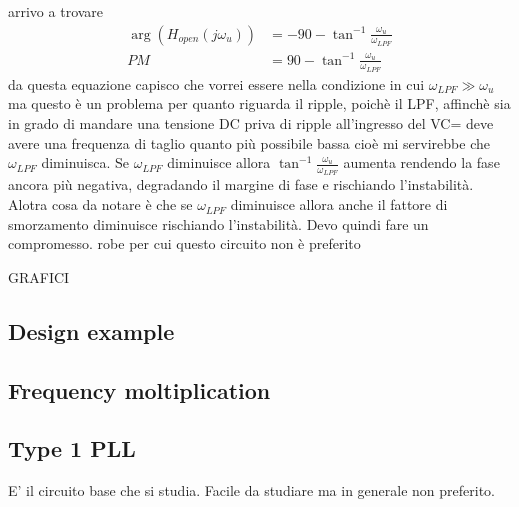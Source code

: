 arrivo a trovare
\begin{align}
    \arg(H_{open}(j\omega_u))&=-90-\tan^{-1}\frac{\omega_u}{\omega_{LPF}} \\
    PM&=90-\tan^{-1}\frac{\omega_u}{\omega_{LPF}} 
\end{align}
da questa equazione capisco che vorrei essere nella condizione in cui $\omega_{LPF} \gg \omega_u$ ma questo è un problema per quanto riguarda il ripple, poichè il LPF, affinchè sia in grado di mandare una tensione DC priva di ripple all'ingresso del VC= deve avere una frequenza di taglio quanto più possibile bassa cioè mi servirebbe che $\omega_{LPF}$ diminuisca.
Se $\omega_{LPF}$ diminuisce allora $\tan^{-1}\frac{\omega_u}{\omega_{LPF}}$ aumenta rendendo la fase ancora più negativa, degradando il margine di fase e rischiando l'instabilità.
Alotra cosa da notare è che se $\omega_{LPF}$ diminuisce allora anche il fattore di smorzamento diminuisce rischiando l'instabilità.
Devo quindi fare un compromesso. robe per cui questo circuito non è preferito

GRAFICI
\subsection{Design example}
\subsection{Frequency moltiplication}
\subsection{Type 1 PLL}


{}%
{}%
%
E' il circuito base che si studia. 
Facile da studiare ma in generale non preferito.

